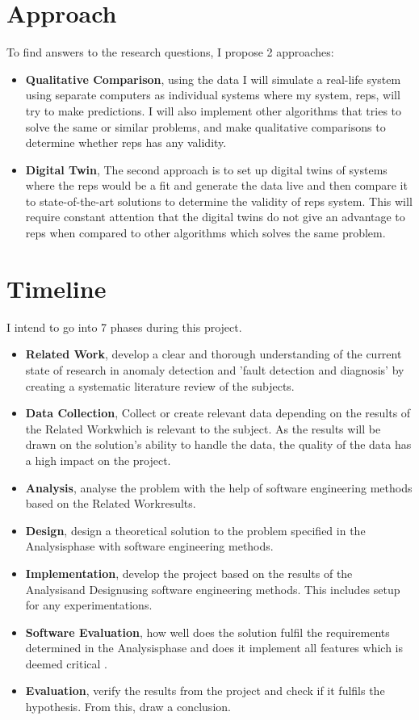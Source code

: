\documentclass[a4paper,8pt]{article}
\newcommand{\Phases}{7 }
\newcommand{\phaseq}{Related Work}
\newcommand{\phasew}{Data Collection}
\newcommand{\phasee}{Analysis}
\newcommand{\phaser}{Design}
\newcommand{\phaset}{Implementation}
\newcommand{\phasey}{Software Evaluation}
\newcommand{\phaseu}{Evaluation}
\begin{document}
	\section{Approach}
		To find answers to the research questions, I propose 2 approaches: 
		\begin{itemize}
			\item \textbf{Qualitative Comparison}, using the data I will simulate a real-life system using separate computers as individual systems where my system, \gls{reps}, will try to make predictions. I will also implement other algorithms that tries to solve the same or similar problems, and make qualitative comparisons to determine whether \gls{reps} has any validity.
			\item \textbf{Digital Twin}, The second approach is to set up digital twins of systems where the \gls{reps} would be a fit and generate the data live and then compare it to state-of-the-art solutions to determine the validity of \gls{reps} system. This will require constant attention that the digital twins do not give an advantage to \gls{reps} when compared to other algorithms which solves the same problem.
		\end{itemize}
		 
		
		
	\section{Timeline}
	I intend to go into \Phases phases during this project.
		\begin{itemize}
			\item \textbf{\phaseq}, develop a clear and thorough understanding of the current state of research in anomaly detection and 'fault detection and diagnosis' by creating a systematic literature review of the subjects.
			\item \textbf{\phasew}, Collect or create relevant data depending on the results of the \phaseq \space which is relevant to the subject. As the results will be drawn on the solution's ability to handle the data, the quality of the data has a high impact on the project.
			\item \textbf{\phasee}, analyse the problem with the help of software engineering methods based on the \phaseq \space results.
			\item \textbf{\phaser}, design a theoretical solution to the problem specified in the \phasee \space phase with software engineering methods.
			\item \textbf{\phaset}, develop the project based on the results of the \phasee \space and \phaser \space using software engineering methods. This includes setup for any experimentations.
			\item \textbf{\phasey}, how well does the solution fulfil the requirements determined in the \phasee \space phase and does it implement all features which is deemed critical .
			\item \textbf{\phaseu}, verify the results from the project and check if it fulfils the hypothesis. From this, draw a conclusion.
		\end{itemize}
	
\end{document}
